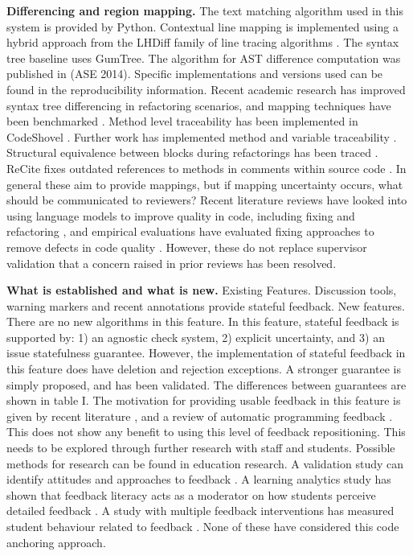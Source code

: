 \documentclass[10pt,conference,letterpaper]{IEEEtran}
\begin{document}
\textbf{Differencing and region mapping.} The text matching algorithm used in this system is provided by Python. Contextual line mapping is implemented using a hybrid approach from the LHDiff family of line tracing algorithms \cite{lhdiff2013}. The syntax tree baseline uses GumTree. The algorithm for AST difference computation was published in \cite{gumtree2014} (ASE 2014). Specific implementations and versions used can be found in the reproducibility information. Recent academic research has improved syntax tree differencing in refactoring scenarios, and mapping techniques have been benchmarked \cite{astdiff2024}. Method level traceability has been implemented in CodeShovel \cite{codeshovel2021}. Further work has implemented method and variable traceability \cite{methodtracking2022}. Structural equivalence between blocks during refactorings has been traced \cite{blocktracking2024}. ReCite fixes outdated references to methods in comments within source code \cite{recite2026}. In general these aim to provide mappings, but if mapping uncertainty occurs, what should be communicated to reviewers? Recent literature reviews have looked into using language models to improve quality in code, including fixing and refactoring \cite{alomari2026}, and empirical evaluations have evaluated fixing approaches to remove defects in code quality \cite{patcas2026}. However, these do not replace supervisor validation that a concern raised in prior reviews has been resolved.

\textbf{What is established and what is new.} Existing Features. Discussion tools, warning markers and recent annotations provide stateful feedback. New features. There are no new algorithms in this feature. In this feature, stateful feedback is supported by: 1) an agnostic check system, 2) explicit uncertainty, and 3) an issue statefulness guarantee. However, the implementation of stateful feedback in this feature does have deletion and rejection exceptions. A stronger guarantee is simply proposed, and has been validated. The differences between guarantees are shown in table I. The motivation for providing usable feedback in this feature is given by recent literature \cite{lei2026,istencioglu2026,zhan2026}, and a review of automatic programming feedback \cite{surveyfeedback2025,surveygrading2024,feedbacktypes2026}. This does not show any benefit to using this level of feedback repositioning. This needs to be explored through further research with staff and students. Possible methods for research can be found in education research. A validation study can identify attitudes and approaches to feedback \cite{woitta2025}. A learning analytics study has shown that feedback literacy acts as a moderator on how students perceive detailed feedback \cite{weidlich2025}. A study with multiple feedback interventions has measured student behaviour related to feedback \cite{zheng2026}. None of these have considered this code anchoring approach.
\end{document}
